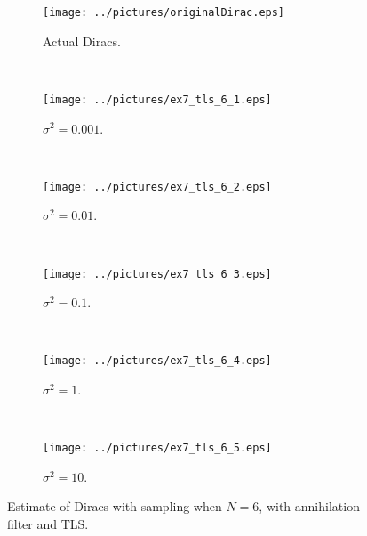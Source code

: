 \documentclass[11pt,a4paper]{report}
\begin{document}
\begin{figure}[H]
    \captionsetup[subfigure]{position=b}
    \centering
    \begin{subfigure}{0.49\textwidth}
        \texttt{[image: ../pictures/originalDirac.eps]}
        \caption{Actual Diracs.}
        \label{fig:ex7_tls_6_0}
    \end{subfigure}
    ~
    \begin{subfigure}{0.49\textwidth}
        \texttt{[image: ../pictures/ex7\_tls\_6\_1.eps]}
        \caption{$\sigma^2 = 0.001$.}
        \label{fig:ex7_tls_6_1}
    \end{subfigure}
    \\
    \begin{subfigure}{0.49\textwidth}
        \texttt{[image: ../pictures/ex7\_tls\_6\_2.eps]}
        \caption{$\sigma^2 = 0.01$.}
        \label{fig:ex7_tls_6_2}
    \end{subfigure}
    ~
    \begin{subfigure}{0.49\textwidth}
        \texttt{[image: ../pictures/ex7\_tls\_6\_3.eps]}
        \caption{$\sigma^2 = 0.1$.}
        \label{fig:ex7_tls_6_3}
    \end{subfigure}
    \\
    \begin{subfigure}{0.49\textwidth}
        \texttt{[image: ../pictures/ex7\_tls\_6\_4.eps]}
        \caption{$\sigma^2 = 1$.}
        \label{fig:ex7_tls_6_4}
    \end{subfigure}
    ~
    \begin{subfigure}{0.49\textwidth}
        \texttt{[image: ../pictures/ex7\_tls\_6\_5.eps]}
        \caption{$\sigma^2 = 10$.}
        \label{fig:ex7_tls_6_5}
    \end{subfigure}

    \caption{Estimate of Diracs with sampling when $N = 6$, with annihilation filter and TLS.}
    \label{fig:ex7_tls_6}
\end{figure}
\end{document}
